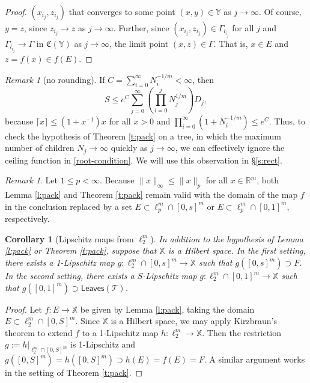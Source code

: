 \documentclass[12pt]{amsart}
\newtheorem{corollary}[theorem]{Corollary}
\theoremstyle{definition}
\theoremstyle{remark}
\newtheorem{remark}[theorem]{Remark}
\newcommand{\RR}{\mathbb{R}}
\newcommand{\XX}{\mathbb{X}}
\newcommand{\YY}{\mathbb{Y}}
\newcommand{\leaves}{\mathsf{Leaves}}
\numberwithin{figure}{section}
\numberwithin{equation}{section}
\begin{document}
\begin{proof}
$(x_{i_j},z_{i_j})$ that converges to some point $(x,y)\in\YY$ as $j\rightarrow\infty$. Of course, $y=z$, since $z_{i_j}\rightarrow z$ as $j\rightarrow\infty$. Further, since $(x_{i_j},z_{i_j})\in\Gamma_{l_{i_j}}$ for all $j$ and $\Gamma_{l_{i_j}}\rightarrow \Gamma$ in $\mathfrak{C}(\YY)$ as $j\rightarrow\infty$, the limit  point $(x,z)\in\Gamma$. That is, $x\in E$ and $z=f(x)\in f(E)$.
\end{proof}

\begin{remark}[no rounding]\label{r:no-ceil} If $C=\sum_{i=0}^\infty N_i^{-1/m}<\infty$, then \begin{equation}S\leq e^C\sum_{j=0}^\infty \left(\prod_{i=0}^j N_{j}^{1/m} \right) D_j,\end{equation} because $\lceil x\rceil \leq (1+x^{-1})x$ for all $x>0$ and $\prod_{i=0}^\infty (1+N_i^{-1/m})\leq e^C$. Thus, to check the hypothesis of Theorem \ref{t:pack} on a tree, in which the maximum number of children $N_j\rightarrow\infty$ quickly as $j\rightarrow\infty$, we can effectively ignore the ceiling function in \eqref{root-condition}. We will use this observation in \S\ref{s:rect}.\end{remark}

\begin{remark}\label{r:other-p} Let $1\leq p<\infty$. Because $\|x\|_\infty\leq \|x\|_p$ for all $x\in\RR^m$, both Lemma \ref{l:pack} and Theorem \ref{t:pack} remain valid with the domain of the map $f$ in the conclusion replaced by a set $E\subset \ell_p^m\cap[0,s]^m$ or $E\subset\ell_p^m\cap[0,1]^m$, respectively. \end{remark}


\begin{corollary}[Lipschitz maps from $\ell_2^m$] \label{c:pack} In addition to the hypothesis of Lemma \ref{l:pack} or Theorem \ref{t:pack}, suppose that $\XX$ is a Hilbert space. In the first setting, there exists a 1-Lipschitz map $g:\ell_2^m\cap [0,s]^m\rightarrow \XX$ such that $g([0,s]^m)\supset F$. In the second setting, there exists a $S$-Lipschitz map $g:\ell_2^m\cap [0,1]^m\rightarrow\XX$ such that $g([0,1]^m)\supset\leaves(\mathcal{T})$.   \end{corollary}

\begin{proof} Let $f:E\rightarrow \XX$ be given by Lemma \ref{l:pack}, taking the domain $E\subset \ell_2^m\cap[0,S]^m$. Since $\XX$ is a Hilbert space, we may apply Kirzbraun's theorem \cite[2.10.43]{Federer} to extend $f$ to a 1-Lipschitz map $h:\ell_2^m\rightarrow\XX$. Then the restriction $g:=h|_{\ell_2^m\cap [0,S]^m}$ is 1-Lipschitz and $g([0,S]^m)=h([0,S]^m)\supset h(E)=f(E)=F$. A similar argument works in the setting of Theorem \ref{t:pack}.\end{proof}
\end{document}
